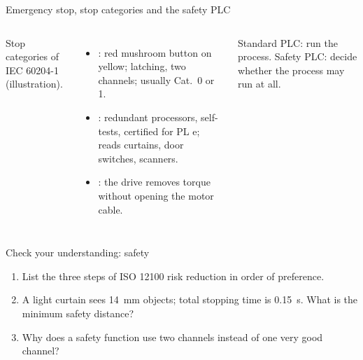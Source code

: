 \documentclass[aspectratio=169,10pt]{beamer}
\begin{document}
\begin{frame}{Emergency stop, stop categories and the safety PLC}
\begin{columns}[T]
\centering
{}
{\scriptsize\color{mkGray} Stop categories of IEC 60204-1 (illustration).}
\begin{itemize}\small
\item {}: red mushroom button on yellow; latching, two channels; usually Cat.\ 0 or 1.
\item {}: redundant processors, self-tests, certified for PL e; reads curtains, door switches, scanners.
\item {}: the drive removes torque without opening the motor cable.
\end{itemize}
\begin{notebox}
\small Standard PLC: run the process. Safety PLC: decide whether the process may run at all.
\end{notebox}
\end{columns}
\end{frame}

\begin{frame}{Check your understanding: safety}
\begin{keybox}
\large
\begin{enumerate}
\item List the three steps of ISO 12100 risk reduction in order of preference.
\item A light curtain sees \SI{14}{mm} objects; total stopping time is \SI{0.15}{s}. What is the minimum safety distance?
\item Why does a safety function use two channels instead of one very good channel?
\end{enumerate}
\end{keybox}
\end{frame}
\end{document}
